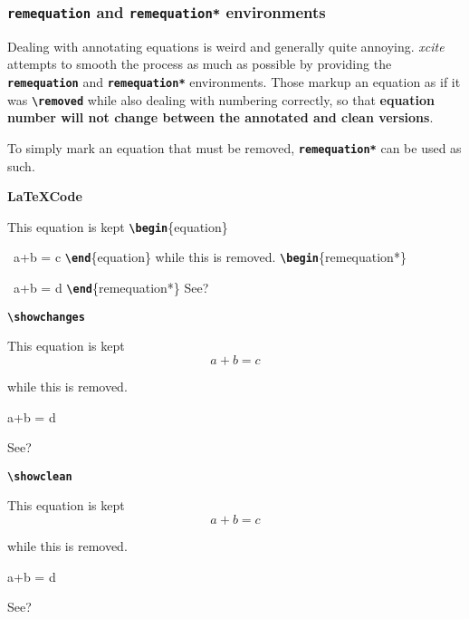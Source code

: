 \documentclass[a4paper]{ltxdoc}
\newcommand{\writecommand}[1]{\texttt{\textbf{{\textbackslash#1}}}}
\newcommand{\writeenv}[1]{\texttt{\textbf{{#1}}}}
\newcommand{\writearg}[1]{\{#1\}}
\begin{document}
\subsubsection{\writeenv{remequation} and \writeenv{remequation*} environments}

Dealing with annotating equations is weird and generally quite annoying.
\textit{xcite} attempts to smooth the process as much as possible by providing the \writeenv{remequation} and \writeenv{remequation*} environments.
Those markup an equation as if it was \writecommand{removed} while also dealing with numbering correctly, so that \textbf{equation number will not change between the annotated and clean versions}.

To simply mark an equation that must be removed, \writeenv{remequation*} can be used as such.

\begin{center}
    \begin{minipage}[t]{0.3\linewidth}
    \textbf{\LaTeX Code}
    
    This equation is kept \newline
    \writecommand{begin}\writearg{equation}

    ~\quad a+b = c\newline
    \writecommand{end}\writearg{equation}\newline
    while this is removed.\newline
    \writecommand{begin}\writearg{remequation*}

    ~\quad a+b = d\newline
    \writecommand{end}\writearg{remequation*}\newline
    See?
    
    \end{minipage}
    \hfill
    \begin{minipage}[t]{0.3\linewidth}
    \writecommand{showchanges}
    \showchanges
    
    This equation is kept
    \begin{equation}
        a+b = c
    \end{equation}\addtocounter{equation}{-1}
    while this is removed.
    \begin{remequation*}
        a+b = d
    \end{remequation*}
    See?
    
    \end{minipage}
    \hfill
    \begin{minipage}[t]{0.3\linewidth}   
    \writecommand{showclean}
    \showclean
    
    This equation is kept
    \begin{equation}
        a+b = c
    \end{equation}\addtocounter{equation}{-1}
    while this is removed.
    \begin{remequation*}
        a+b = d
    \end{remequation*}
    See?

\end{minipage}
\end{center}
\showchanges
\end{document}
